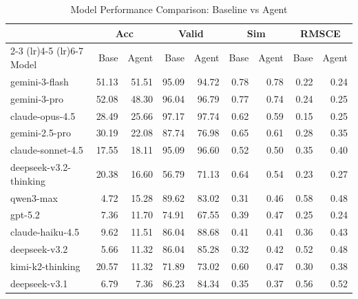 \begin{table}
\centering
\caption{Model Performance Comparison: Baseline vs Agent}
\begin{tabular}{lrrrrrrrr}
\toprule
 & \multicolumn{2}{c}{Acc} & \multicolumn{2}{c}{Valid} & \multicolumn{2}{c}{Sim} & \multicolumn{2}{c}{RMSCE} \\
\cmidrule(lr){2-3} \cmidrule(lr){4-5} \cmidrule(lr){6-7}
Model & Base & Agent & Base & Agent & Base & Agent & Base & Agent \\
\midrule
gemini-3-flash & 51.13 & 51.51 & 95.09 & 94.72 & 0.78 & 0.78 & 0.22 & 0.24 \\
gemini-3-pro & 52.08 & 48.30 & 96.04 & 96.79 & 0.77 & 0.74 & 0.24 & 0.25 \\
claude-opus-4.5 & 28.49 & 25.66 & 97.17 & 97.74 & 0.62 & 0.59 & 0.15 & 0.25 \\
gemini-2.5-pro & 30.19 & 22.08 & 87.74 & 76.98 & 0.65 & 0.61 & 0.28 & 0.35 \\
claude-sonnet-4.5 & 17.55 & 18.11 & 95.09 & 96.60 & 0.52 & 0.50 & 0.35 & 0.40 \\
deepseek-v3.2-thinking & 20.38 & 16.60 & 56.79 & 71.13 & 0.64 & 0.54 & 0.23 & 0.27 \\
qwen3-max & 4.72 & 15.28 & 89.62 & 83.02 & 0.31 & 0.46 & 0.58 & 0.48 \\
gpt-5.2 & 7.36 & 11.70 & 74.91 & 67.55 & 0.39 & 0.47 & 0.25 & 0.24 \\
claude-haiku-4.5 & 9.62 & 11.51 & 86.04 & 88.68 & 0.41 & 0.41 & 0.36 & 0.43 \\
deepseek-v3.2 & 5.66 & 11.32 & 86.04 & 85.28 & 0.32 & 0.42 & 0.52 & 0.48 \\
kimi-k2-thinking & 20.57 & 11.32 & 71.89 & 73.02 & 0.60 & 0.47 & 0.30 & 0.38 \\
deepseek-v3.1 & 6.79 & 7.36 & 86.23 & 84.34 & 0.35 & 0.37 & 0.56 & 0.52 \\
\bottomrule
\end{tabular}
\end{table}
